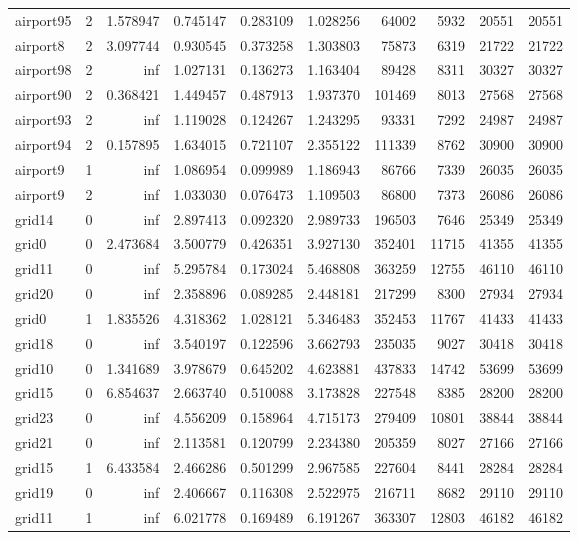 \begin{longtable}{|l|r|r|r|r|r|r|r|r|r|}
airport95 & 2 & 1.578947 & 0.745147 & 0.283109 & 1.028256 & 64002 & 5932 & 20551 & 20551 \\
airport8 & 2 & 3.097744 & 0.930545 & 0.373258 & 1.303803 & 75873 & 6319 & 21722 & 21722 \\
airport98 & 2 & inf & 1.027131 & 0.136273 & 1.163404 & 89428 & 8311 & 30327 & 30327 \\
airport90 & 2 & 0.368421 & 1.449457 & 0.487913 & 1.937370 & 101469 & 8013 & 27568 & 27568 \\
airport93 & 2 & inf & 1.119028 & 0.124267 & 1.243295 & 93331 & 7292 & 24987 & 24987 \\
airport94 & 2 & 0.157895 & 1.634015 & 0.721107 & 2.355122 & 111339 & 8762 & 30900 & 30900 \\
airport9 & 1 & inf & 1.086954 & 0.099989 & 1.186943 & 86766 & 7339 & 26035 & 26035 \\
airport9 & 2 & inf & 1.033030 & 0.076473 & 1.109503 & 86800 & 7373 & 26086 & 26086 \\
grid14 & 0 & inf & 2.897413 & 0.092320 & 2.989733 & 196503 & 7646 & 25349 & 25349 \\
grid0 & 0 & 2.473684 & 3.500779 & 0.426351 & 3.927130 & 352401 & 11715 & 41355 & 41355 \\
grid11 & 0 & inf & 5.295784 & 0.173024 & 5.468808 & 363259 & 12755 & 46110 & 46110 \\
grid20 & 0 & inf & 2.358896 & 0.089285 & 2.448181 & 217299 & 8300 & 27934 & 27934 \\
grid0 & 1 & 1.835526 & 4.318362 & 1.028121 & 5.346483 & 352453 & 11767 & 41433 & 41433 \\
grid18 & 0 & inf & 3.540197 & 0.122596 & 3.662793 & 235035 & 9027 & 30418 & 30418 \\
grid10 & 0 & 1.341689 & 3.978679 & 0.645202 & 4.623881 & 437833 & 14742 & 53699 & 53699 \\
grid15 & 0 & 6.854637 & 2.663740 & 0.510088 & 3.173828 & 227548 & 8385 & 28200 & 28200 \\
grid23 & 0 & inf & 4.556209 & 0.158964 & 4.715173 & 279409 & 10801 & 38844 & 38844 \\
grid21 & 0 & inf & 2.113581 & 0.120799 & 2.234380 & 205359 & 8027 & 27166 & 27166 \\
grid15 & 1 & 6.433584 & 2.466286 & 0.501299 & 2.967585 & 227604 & 8441 & 28284 & 28284 \\
grid19 & 0 & inf & 2.406667 & 0.116308 & 2.522975 & 216711 & 8682 & 29110 & 29110 \\
grid11 & 1 & inf & 6.021778 & 0.169489 & 6.191267 & 363307 & 12803 & 46182 & 46182 \\

\end{longtable}
